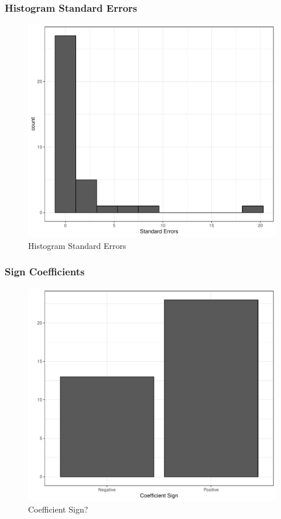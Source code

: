 \documentclass[
]{article}
\begin{document}
\newpage

\hypertarget{histogram-standard-errors}{%
\subsubsection{Histogram Standard
Errors}\label{histogram-standard-errors}}

\begin{figure}
\centering
\includegraphics{appendixV5_files/figure-latex/unnamed-chunk-7-1.pdf}
\caption{Histogram Standard Errors}
\end{figure}

\newpage

\hypertarget{sign-coefficients}{%
\subsubsection{Sign Coefficients}\label{sign-coefficients}}

\begin{figure}
\centering
\includegraphics{appendixV5_files/figure-latex/unnamed-chunk-8-1.pdf}
\caption{Coefficient Sign?}
\end{figure}
\end{document}
